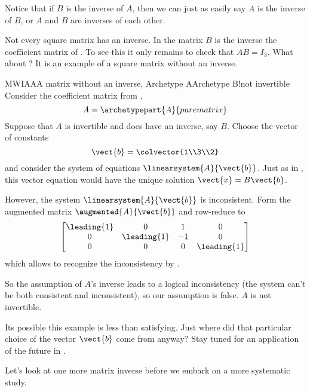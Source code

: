 %
Notice that if $B$ is the inverse of $A$, then we can just as easily say $A$ is the inverse of $B$, or $A$ and $B$ are inverses of each other.\par
%
Not every square matrix has an inverse.  In  the matrix $B$ is the inverse the coefficient matrix of .  To see this it only remains to check that $AB=I_3$.  What about ?  It is an example of a square matrix without an inverse.
%
\begin{example}{MWIAA}{A matrix without an inverse, Archetype A}{Archetype B!not invertible}
Consider the coefficient matrix from ,
%
\begin{equation*}
A=\archetypepart{A}{purematrix}
\end{equation*}
%
Suppose that $A$ is invertible and does have an inverse, say $B$.  Choose the vector of constants
%
\begin{equation*}
\vect{b}=\colvector{1\\3\\2}
\end{equation*}
%
and consider the system of equations $\linearsystem{A}{\vect{b}}$.  Just as in , this vector equation would have the unique solution $\vect{x}=B\vect{b}$.\par
%
However, the system $\linearsystem{A}{\vect{b}}$ is inconsistent.  Form the augmented matrix $\augmented{A}{\vect{b}}$ and row-reduce to
%
\begin{equation*}
\begin{bmatrix}
\leading{1} & 0 & 1 & 0\\
0 & \leading{1} & -1 & 0\\
0 & 0 & 0 & \leading{1}
\end{bmatrix}
\end{equation*}
%
which allows to recognize the inconsistency by .\par
%
So the assumption of $A$'s inverse leads to a logical inconsistency (the system can't be both consistent and inconsistent), so our assumption is false.  $A$ is not invertible.\par
%
Its possible this example is less than satisfying.  Just where did that particular choice of the vector $\vect{b}$ come from anyway?  Stay tuned for an application of the future  in .
%
\end{example}
%
Let's look at one more matrix inverse before we embark on a more systematic study.
